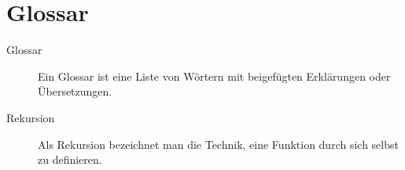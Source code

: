 \chapter{Glossar}

\begin{description}
  \item[Glossar] Ein Glossar ist eine Liste von Wörtern mit beigefügten Erklärungen oder Übersetzungen.
  \item[Rekursion] Als Rekursion bezeichnet man die Technik, eine Funktion durch sich selbst zu definieren.
\end{description}

